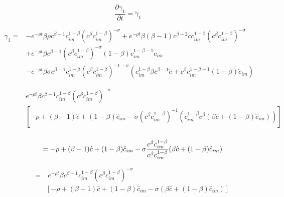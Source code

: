 	\begin{equation}
		\frac{\partial\gamma_1}{\partial t} = \dot{\gamma}_{1}
	\end{equation}


	\begin{equation*}
		\begin{split}
			\dot{\gamma}_{1} = &-e^{-\rho t} \beta \rho c^{\beta -1} c_{im}^{1- \beta} (c^{\beta} c_{im}^{1- \beta})^{- \sigma} + e^{-\rho t} \beta (\beta -1 )c^{\beta -2}\dot{c}c_{im}^{1- \beta}(c^{\beta} c_{im}^{1- \beta})^{- \sigma}\\
			& + e^{- \rho t} \beta c^{\beta -1} (c^{\beta} c_{im}^{1- \beta})^{- \sigma}(1- \beta) c_{im}^{1- \beta -1} \dot{c}_{im}\\
			&- e^{- \rho t} \beta \sigma c^{\beta -1} c_{im}^{1- \beta} (c^{\beta} c_{im}^{1- \beta})^{-1- \sigma} (c_{im}^{1- \beta} \beta c^{\beta -1} \dot{c} + c^{\beta} c_{im}^{1- \beta -1}(1- \beta) \dot{c}_{im})
		\end{split}
	\end{equation*}


	\begin{equation*}
		\begin{split}
			~\quad = ~& e^{- \rho t} \beta c^{\beta -1} c_{im}^{1- \beta} (c^{\beta} c_{im}^{1- \beta})^{- \sigma} \\
			&\left [ - \rho + (\beta -1)\hat{c}+(1-\beta)\hat{c}_{im} - \sigma (c^{\beta} c_{im}^{1- \beta})^{-1} (c_{im}^{1- \beta} c^{\beta} (\beta \hat{c} + (1- \beta) \hat{c}_{im})) \right]\\
		\end{split}
	\end{equation*}


	\begin{equation*}
		~\quad = - \rho + (\beta - 1) \hat{c} + (1- \beta) \hat{c}_{im} - \sigma \frac{c^{ \beta} c_{im}^{1- \beta}} {c^{\beta} c_{im}^{1- \beta}} (\beta \hat{c} + (1- \beta) \hat{c}_{im})\\
	\end{equation*}


	\begin{equation*}
		\begin{split}
			\quad~ = &~ e^{- \rho t} \beta c^{\beta -1} c_{im}^{1- \beta} (c^{\beta} c_{im}^{1- \beta} )^{- \sigma}\\
			&\left [ - \rho + (\beta-1) \hat{c} + (1- \beta) \hat{c}_{im} - \sigma (\beta \hat{c} + (1- \beta) \hat{c}_{im}) \right ]\\
		\end{split}
	\end{equation*}


